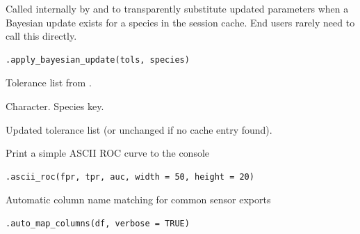\documentclass[a4paper]{book}
\begin{document}
%
\begin{Description}
Called internally by  and  to
transparently substitute updated parameters when a Bayesian update exists
for a species in the session cache. End users rarely need to call this
directly.
\end{Description}
%
\begin{Usage}
\begin{verbatim}
.apply_bayesian_update(tols, species)
\end{verbatim}
\end{Usage}
%
\begin{Arguments}
\begin{ldescription}
\item[\code{tols}] Tolerance list from .

\item[\code{species}] Character. Species key.
\end{ldescription}
\end{Arguments}
%
\begin{Value}
Updated tolerance list (or unchanged if no cache entry found).
\end{Value}
%
\begin{Description}
Print a simple ASCII ROC curve to the console
\end{Description}
%
\begin{Usage}
\begin{verbatim}
.ascii_roc(fpr, tpr, auc, width = 50, height = 20)
\end{verbatim}
\end{Usage}
%
\begin{Description}
Automatic column name matching for common sensor exports
\end{Description}
%
\begin{Usage}
\begin{verbatim}
.auto_map_columns(df, verbose = TRUE)
\end{verbatim}
\end{Usage}
\end{document}
